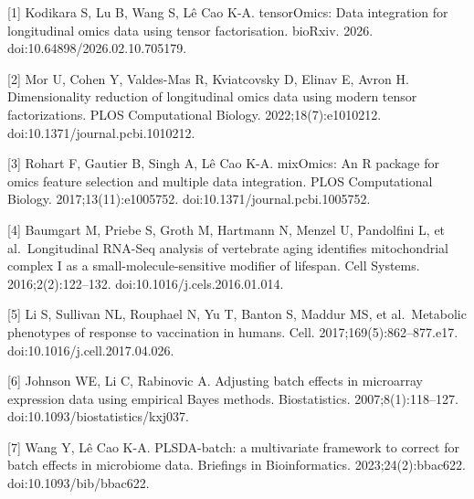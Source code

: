 \documentclass[
]{article}
\begin{document}
{[}1{]} Kodikara S, Lu B, Wang S, Lê Cao K-A. tensorOmics: Data
integration for longitudinal omics data using tensor factorisation.
bioRxiv. 2026. doi:10.64898/2026.02.10.705179.

{[}2{]} Mor U, Cohen Y, Valdes-Mas R, Kviatcovsky D, Elinav E, Avron H.
Dimensionality reduction of longitudinal omics data using modern tensor
factorizations. PLOS Computational Biology. 2022;18(7):e1010212.
doi:10.1371/journal.pcbi.1010212.

{[}3{]} Rohart F, Gautier B, Singh A, Lê Cao K-A. mixOmics: An R package
for omics feature selection and multiple data integration. PLOS
Computational Biology. 2017;13(11):e1005752.
doi:10.1371/journal.pcbi.1005752.

{[}4{]} Baumgart M, Priebe S, Groth M, Hartmann N, Menzel U, Pandolfini
L, et al.~Longitudinal RNA-Seq analysis of vertebrate aging identifies
mitochondrial complex I as a small-molecule-sensitive modifier of
lifespan. Cell Systems. 2016;2(2):122--132.
doi:10.1016/j.cels.2016.01.014.

{[}5{]} Li S, Sullivan NL, Rouphael N, Yu T, Banton S, Maddur MS, et
al.~Metabolic phenotypes of response to vaccination in humans. Cell.
2017;169(5):862--877.e17. doi:10.1016/j.cell.2017.04.026.

{[}6{]} Johnson WE, Li C, Rabinovic A. Adjusting batch effects in
microarray expression data using empirical Bayes methods. Biostatistics.
2007;8(1):118--127. doi:10.1093/biostatistics/kxj037.

{[}7{]} Wang Y, Lê Cao K-A. PLSDA-batch: a multivariate framework to
correct for batch effects in microbiome data. Briefings in
Bioinformatics. 2023;24(2):bbac622. doi:10.1093/bib/bbac622.
\end{document}
